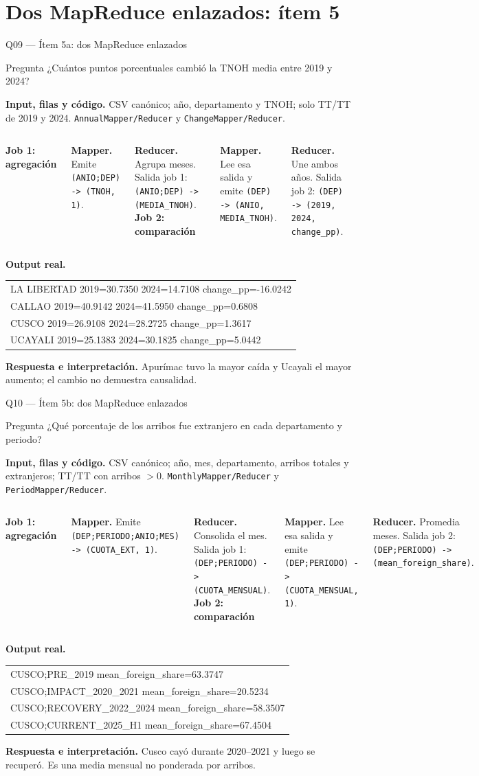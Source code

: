 \documentclass{beamer}
\newcommand{\dualqueryframe}[9]{%
\begin{frame}{#1}
\scriptsize
\begin{alertblock}{Pregunta}
#2
\end{alertblock}
\textbf{Input, filas y código.} #3

\vspace{0.35em}
\begin{columns}[T,onlytextwidth]
\column{0.49\textwidth}
\centering\textbf{Job 1: agregación}\par
\raggedright
\textbf{Mapper.} #4

\vspace{0.35em}
\textbf{Reducer.} #5
\column{0.49\textwidth}
\centering\textbf{Job 2: comparación}\par
\raggedright
\textbf{Mapper.} #6

\vspace{0.35em}
\textbf{Reducer.} #7
\end{columns}
\vspace{0.45em}
\textbf{Output real.} {\ttfamily\tiny #8}

\vspace{0.35em}
\textbf{Respuesta e interpretación.} #9
\end{frame}
}
\begin{document}
\section{Dos MapReduce enlazados: ítem 5}

\dualqueryframe{Q09 — Ítem 5a: dos MapReduce enlazados}
{¿Cuántos puntos porcentuales cambió la TNOH media entre 2019 y 2024?}
{CSV canónico; año, departamento y TNOH; solo TT/TT de 2019 y 2024. \texttt{AnnualMapper/Reducer} y \texttt{ChangeMapper/Reducer}.}
{Emite \texttt{(ANIO;DEP) -> (TNOH, 1)}.}
{Agrupa meses. Salida job 1: \texttt{(ANIO;DEP) -> (MEDIA\_TNOH)}.}
{Lee esa salida y emite \texttt{(DEP) -> (ANIO, MEDIA\_TNOH)}.}
{Une ambos años. Salida job 2: \texttt{(DEP) -> (2019, 2024, change\_pp)}.}
{\begin{tabular}{@{}l@{}}
LA LIBERTAD 2019=30.7350 2024=14.7108 change\_pp=-16.0242 \\
CALLAO 2019=40.9142 2024=41.5950 change\_pp=0.6808 \\
CUSCO 2019=26.9108 2024=28.2725 change\_pp=1.3617 \\
UCAYALI 2019=25.1383 2024=30.1825 change\_pp=5.0442
\end{tabular}}
{Apurímac tuvo la mayor caída y Ucayali el mayor aumento; el cambio no demuestra causalidad.}

\dualqueryframe{Q10 — Ítem 5b: dos MapReduce enlazados}
{¿Qué porcentaje de los arribos fue extranjero en cada departamento y periodo?}
{CSV canónico; año, mes, departamento, arribos totales y extranjeros; TT/TT con arribos $>0$. \texttt{MonthlyMapper/Reducer} y \texttt{PeriodMapper/Reducer}.}
{Emite \texttt{(DEP;PERIODO;ANIO;MES) -> (CUOTA\_EXT, 1)}.}
{Consolida el mes. Salida job 1: \texttt{(DEP;PERIODO) -> (CUOTA\_MENSUAL)}.}
{Lee esa salida y emite \texttt{(DEP;PERIODO) -> (CUOTA\_MENSUAL, 1)}.}
{Promedia meses. Salida job 2: \texttt{(DEP;PERIODO) -> (mean\_foreign\_share)}.}
{\begin{tabular}{@{}l@{}}
CUSCO;PRE\_2019 mean\_foreign\_share=63.3747 \\
CUSCO;IMPACT\_2020\_2021 mean\_foreign\_share=20.5234 \\
CUSCO;RECOVERY\_2022\_2024 mean\_foreign\_share=58.3507 \\
CUSCO;CURRENT\_2025\_H1 mean\_foreign\_share=67.4504
\end{tabular}}
{Cusco cayó durante 2020--2021 y luego se recuperó. Es una media mensual no ponderada por arribos.}
\end{document}
